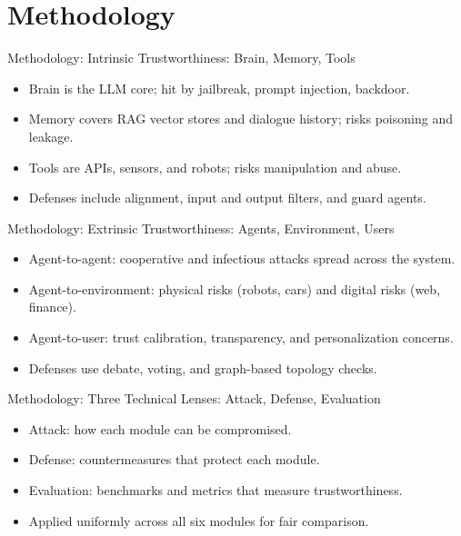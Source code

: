 \documentclass[10pt]{beamer}
\begin{document}
\section{Methodology}
\begin{frame}[allowframebreaks]{Methodology: Intrinsic Trustworthiness: Brain, Memory, Tools}
\begin{itemize}
  \item Brain is the LLM core; hit by jailbreak, prompt injection, backdoor.
  \item Memory covers RAG vector stores and dialogue history; risks poisoning and leakage.
  \item Tools are APIs, sensors, and robots; risks manipulation and abuse.
  \item Defenses include alignment, input and output filters, and guard agents.
\end{itemize}
\end{frame}
\begin{frame}[allowframebreaks]{Methodology: Extrinsic Trustworthiness: Agents, Environment, Users}
\begin{itemize}
  \item Agent-to-agent: cooperative and infectious attacks spread across the system.
  \item Agent-to-environment: physical risks (robots, cars) and digital risks (web, finance).
  \item Agent-to-user: trust calibration, transparency, and personalization concerns.
  \item Defenses use debate, voting, and graph-based topology checks.
\end{itemize}
\end{frame}
\begin{frame}[allowframebreaks]{Methodology: Three Technical Lenses: Attack, Defense, Evaluation}
\begin{itemize}
  \item Attack: how each module can be compromised.
  \item Defense: countermeasures that protect each module.
  \item Evaluation: benchmarks and metrics that measure trustworthiness.
  \item Applied uniformly across all six modules for fair comparison.
\end{itemize}
\end{frame}
\end{document}
